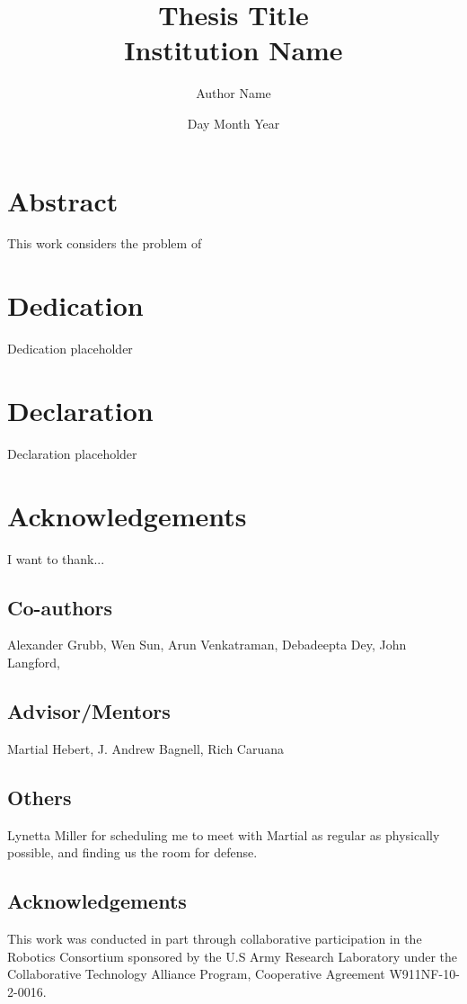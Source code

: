 \documentclass[]{report}
\title{
{Thesis Title}\\
{\large Institution Name}
}
\author{Author Name}
\date{Day Month Year}
\begin{document}
\maketitle


\chapter*{Abstract}
This work considers the problem of

\chapter*{Dedication}
Dedication placeholder

\chapter*{Declaration}
Declaration placeholder

\chapter*{Acknowledgements}
I want to thank...

\section*{Co-authors}
Alexander Grubb, Wen Sun, Arun Venkatraman, Debadeepta Dey, John Langford, 

\section*{Advisor/Mentors}
 Martial Hebert, J. Andrew Bagnell, Rich Caruana 

\section*{Others}
Lynetta Miller for scheduling me to meet with Martial as regular as physically possible, and finding us the room for defense.



\section*{Acknowledgements} 
This work was conducted in part through collaborative participation in the Robotics Consortium sponsored by the U.S Army Research Laboratory under the Collaborative Technology Alliance Program, Cooperative Agreement W911NF-10-2-0016. 
\end{document}
